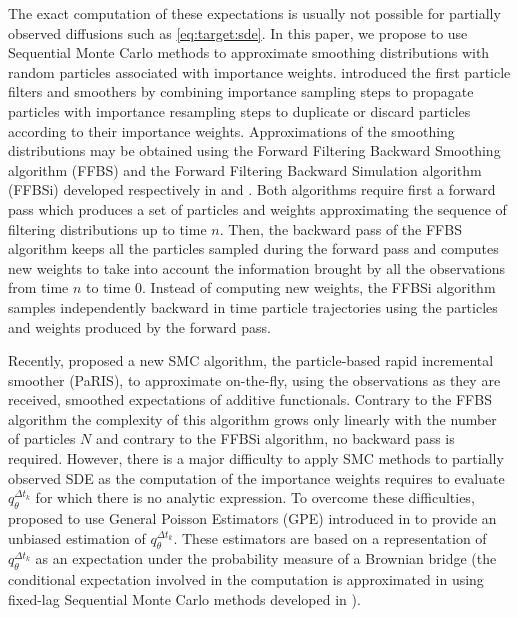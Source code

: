 \documentclass[12pt]{article}
\newcommand{\1}{\mathrm{1}}
\begin{document}
The exact computation of these expectations is usually not possible for partially observed diffusions such as \eqref{eq:target:sde}. In this paper, we propose to use Sequential Monte Carlo methods to approximate smoothing distributions with random particles associated with importance weights. \cite{gordon:salmond:smith:1993,kitagawa:1996} introduced the first particle filters and smoothers by combining importance sampling steps to propagate particles with importance resampling steps to duplicate or discard particles according to their importance weights.  Approximations of the smoothing distributions may be obtained using the Forward Filtering Backward Smoothing algorithm (FFBS) and  the Forward Filtering Backward Simulation algorithm (FFBSi) developed respectively in \cite{kitagawa:1996,huerzeler:kunsch:1998,doucet:godsill:andrieu:2000} and \cite{godsill:doucet:west:2004}. Both algorithms require first a forward pass which produces a set of particles and weights approximating the sequence of filtering distributions up to time $n$. Then, the backward pass of the FFBS algorithm keeps all the particles sampled during the forward pass and computes new weights to take into account the information brought by all the observations from time $n$ to time $0$. Instead of computing new weights, the FFBSi  algorithm samples independently backward in time particle trajectories using the particles and weights produced by the forward pass. 

Recently, \cite{olsson:westerborn:2016} proposed a new SMC algorithm, the particle-based rapid incremental smoother (PaRIS), to approximate on-the-fly, using the observations as they are received, smoothed expectations of additive functionals. Contrary to the FFBS algorithm the complexity of this algorithm grows only linearly with the number of particles $N$ and contrary to the FFBSi algorithm, no backward pass is required. However, there is a major difficulty to apply SMC methods to partially observed SDE as the computation of the importance weights requires to evaluate $q^{\Delta t_k}_{\theta}$ for which there is no analytic expression.
To overcome these difficulties, \cite{olsson:strojby:2011} proposed to use General Poisson Estimators (GPE) introduced in \cite{beskos:papaspiliopoulos:roberts:fearnhead:2006,fearnhead:papaspiliopoulos:roberts:2008}  to provide an unbiased estimation of $q^{\Delta t_k}_{\theta}$. These estimators are based on a representation of $q^{\Delta t_k}_{\theta}$ as an expectation under the probability measure of a Brownian bridge (the conditional expectation involved in the computation is approximated in  \cite{olsson:strojby:2011}  using fixed-lag Sequential Monte Carlo methods developed in \cite{olsson:cappe:douc:moulines:2008}). 
\end{document}
